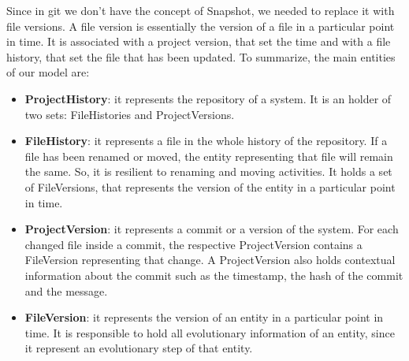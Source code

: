 Since in git we don't have the concept of Snapshot, we needed to replace it with file versions. 
A file version is essentially the version of a file in a particular point in time. 
It is associated with a project version, that set the time and with a file history, that set the file that has been updated.
To summarize, the main entities of our model are: 
\begin{itemize}
    \item \textbf{ProjectHistory}: it represents the repository of a system. It is an holder of two sets: FileHistories and ProjectVersions. 
    \item \textbf{FileHistory}: it represents a file in the whole history of the repository.
     If a file has been renamed or moved, the entity representing that file will remain the same.
     So, it is resilient to renaming and moving activities. 
     It holds a set of FileVersions, that represents the version of the entity in a particular point in time. 
    \item \textbf{ProjectVersion}: it represents a commit or a version of the system. 
    For each changed file inside a commit, the respective ProjectVersion contains a FileVersion representing that change.
    A ProjectVersion also holds contextual information about the commit such as the timestamp, the hash of the commit and the message.
    \item \textbf{FileVersion}: it represents the version of an entity in a particular point in time.
    It is responsible to hold all evolutionary information of an entity, since it represent an evolutionary step of that entity. 
\end{itemize}
\bigbreak

